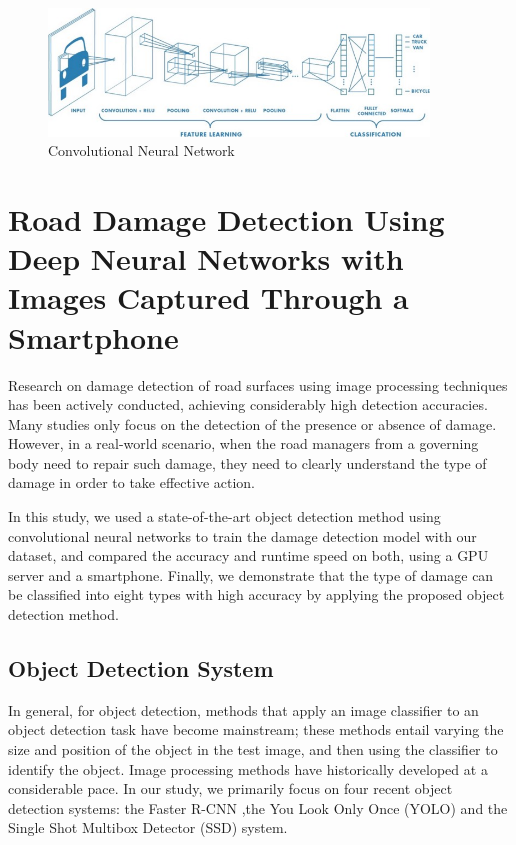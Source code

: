 \documentclass[12pt]{report}
\begin{document}
\begin{figure}[h!]\includegraphics[width=0.9\textwidth]{CNN.jpeg}\caption{Convolutional Neural Network\cite{Raghav}}\label{fig:CNN} \end{figure}%

\section{Road Damage Detection Using Deep Neural Networks with Images Captured Through a Smartphone}

Research on damage detection of road surfaces using image processing techniques has been actively conducted, achieving considerably high detection accuracies. Many studies only focus on the detection of the presence or absence of damage. However, in a real-world
scenario, when the road managers from a governing body need to repair such damage, they need to clearly understand the type of damage in order to take effective action\cite{Neural}.

In this study, we used a state-of-the-art object detection method using convolutional neural networks to train the damage detection model with our dataset, and compared the accuracy and runtime speed on both, using a GPU server and a smartphone. Finally, we demonstrate that the type of damage can be classified into eight types with high accuracy by applying the proposed object detection method.

\subsection{Object Detection System}
In general, for object detection, methods that apply an image classifier to an object detection task have become mainstream; these methods entail varying the size and position of the object in the test image, and then using the classifier to identify the object.
Image processing methods have historically developed at a considerable pace\cite{Neural}. In our study, we primarily focus on four recent object detection systems: the Faster R-CNN\cite{CNN} ,the You Look Only Once (YOLO)\cite{YOLO}  and the Single Shot Multibox Detector (SSD) system\cite{SSD}.
\end{document}
